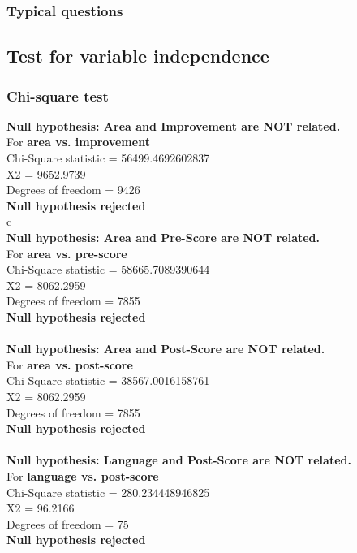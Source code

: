 \documentclass[10pt]{article}
\begin{document}
\subsubsection{Typical questions}
\subsection{Test for variable independence}
\newpage
\subsubsection{Chi-square test}
\textbf{Null hypothesis: Area and Improvement are NOT related.} \\
 For \textbf{area vs. improvement}\\
 Chi-Square statistic = 56499.4692602837\\
 X2 = 9652.9739\\
 Degrees of freedom = 9426\\
 \textbf{Null hypothesis rejected}\\c
\\
\textbf{Null hypothesis: Area and Pre-Score are NOT related.}\\
 For \textbf{area vs. pre-score}\\
 Chi-Square statistic = 58665.7089390644\\
 X2 = 8062.2959\\
 Degrees of freedom = 7855\\
 \textbf{Null hypothesis rejected}\\
\\
\textbf{Null hypothesis: Area and Post-Score are NOT related.}\\
 For \textbf{area vs. post-score}\\
 Chi-Square statistic = 38567.0016158761\\
 X2 = 8062.2959\\
 Degrees of freedom = 7855\\
 \textbf{Null hypothesis rejected}\\
\\
\textbf{Null hypothesis: Language and Post-Score are NOT related.}\\
 For \textbf{language vs. post-score}\\
 Chi-Square statistic = 280.234448946825\\
 X2 = 96.2166\\
 Degrees of freedom = 75\\
 \textbf{Null hypothesis rejected}\\
\end{document}
